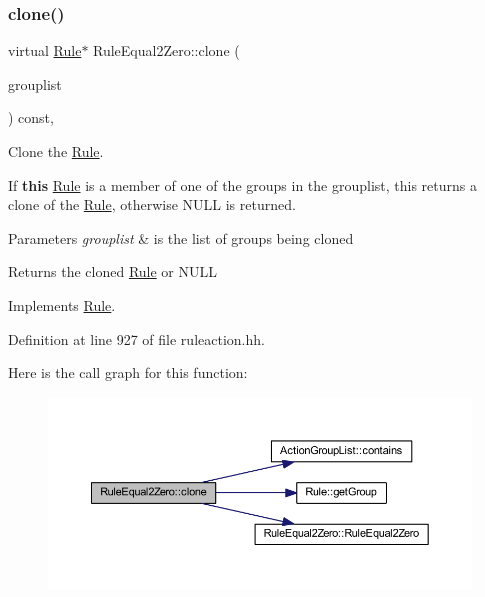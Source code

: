 \subsubsection{\texorpdfstring{clone()}{clone()}}
{\footnotesize\ttfamily virtual \mbox{\hyperlink{class_rule}{Rule}}$\ast$ Rule\+Equal2\+Zero\+::clone (\begin{DoxyParamCaption}\item[{const \mbox{\hyperlink{class_action_group_list}{Action\+Group\+List}} \&}]{grouplist }\end{DoxyParamCaption}) const\hspace{0.3cm}{\ttfamily [inline]}, {\ttfamily [virtual]}}



Clone the \mbox{\hyperlink{class_rule}{Rule}}. 

If {\bfseries{this}} \mbox{\hyperlink{class_rule}{Rule}} is a member of one of the groups in the grouplist, this returns a clone of the \mbox{\hyperlink{class_rule}{Rule}}, otherwise N\+U\+LL is returned. 
\begin{DoxyParams}{Parameters}
{\em grouplist} & is the list of groups being cloned \\
\hline
\end{DoxyParams}
\begin{DoxyReturn}{Returns}
the cloned \mbox{\hyperlink{class_rule}{Rule}} or N\+U\+LL 
\end{DoxyReturn}


Implements \mbox{\hyperlink{class_rule_a70de90a76461bfa7ea0b575ce3c11e4d}{Rule}}.



Definition at line 927 of file ruleaction.\+hh.

Here is the call graph for this function\+:
\nopagebreak
\begin{figure}[H]
\begin{center}
\leavevmode
\includegraphics[width=350pt]{class_rule_equal2_zero_ac77dab90494d8a0d1ca81c6c5a2e0962_cgraph}
\end{center}
\end{figure}
\mbox{\label{class_rule_equal2_zero_a4a75bdf103127765317c10b1c3bb800f}} 
